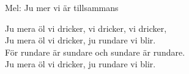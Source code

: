 \begin{SongText}
    \begin{SongInfo}
        Mel: Ju mer vi är tillsammans
    \end{SongInfo}
    \begin{SongVerse}
        Ju mera öl vi dricker, vi dricker, vi dricker,\\%
        Ju mera öl vi dricker, ju rundare vi blir.\\%
        För rundare är sundare och sundare är rundare.\\%
        Ju mera öl vi dricker, ju rundare vi blir.
    \end{SongVerse}
\end{SongText}
